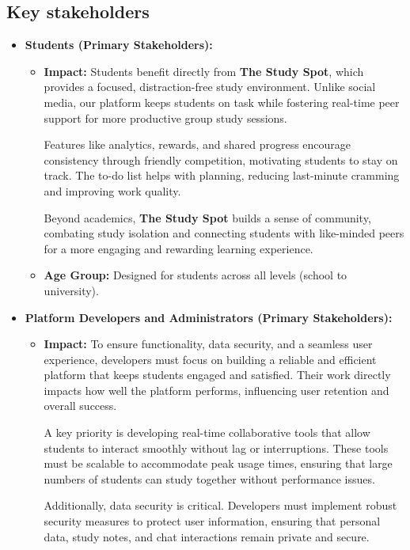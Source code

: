 \subsection{Key stakeholders}
\begin{itemize}
    \item \textbf{Students (Primary Stakeholders):}
    \begin{itemize}
        \item \textbf{Impact:} Students benefit directly from \textbf{The Study Spot}, which provides a focused, distraction-free study environment. Unlike social media, our platform keeps students on task while fostering real-time peer support for more productive group study sessions.  
        
        Features like analytics, rewards, and shared progress encourage consistency through friendly competition, motivating students to stay on track. The to-do list helps with planning, reducing last-minute cramming and improving work quality.  
        
        Beyond academics, \textbf{The Study Spot} builds a sense of community, combating study isolation and connecting students with like-minded peers for a more engaging and rewarding learning experience.
        \item \textbf{Age Group:} Designed for students across all levels (school to university).
    \end{itemize}
    
    \item \textbf{Platform Developers and Administrators (Primary Stakeholders):}
    \begin{itemize}
        \item \textbf{Impact:} To ensure functionality, data security, and a seamless user experience, developers must focus on building a reliable and efficient platform that keeps students engaged and satisfied. Their work directly impacts how well the platform performs, influencing user retention and overall success.  

        A key priority is developing real-time collaborative tools that allow students to interact smoothly without lag or interruptions. These tools must be scalable to accommodate peak usage times, ensuring that large numbers of students can study together without performance issues.  
        
        Additionally, data security is critical. Developers must implement robust security measures to protect user information, ensuring that personal data, study notes, and chat interactions remain private and secure.  
        

\end{itemize}
\end{itemize}
